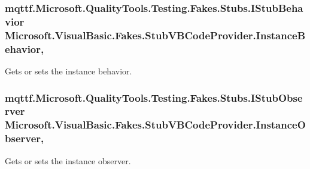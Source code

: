 \hypertarget{class_microsoft_1_1_visual_basic_1_1_fakes_1_1_stub_v_b_code_provider_ace79ea1790dee743c9803210aa43a1ec}{
\subsubsection[{Instance\-Behavior}]{\setlength{\rightskip}{0pt plus 5cm}mqttf.\-Microsoft.\-Quality\-Tools.\-Testing.\-Fakes.\-Stubs.\-I\-Stub\-Behavior Microsoft.\-Visual\-Basic.\-Fakes.\-Stub\-V\-B\-Code\-Provider.\-Instance\-Behavior\hspace{0.3cm}{\ttfamily [get]}, {\ttfamily [set]}}}\label{class_microsoft_1_1_visual_basic_1_1_fakes_1_1_stub_v_b_code_provider_ace79ea1790dee743c9803210aa43a1ec}


Gets or sets the instance behavior.

\hypertarget{class_microsoft_1_1_visual_basic_1_1_fakes_1_1_stub_v_b_code_provider_a46d5cfd9d5b313f3ba1c9324069fadd3}{
\subsubsection[{Instance\-Observer}]{\setlength{\rightskip}{0pt plus 5cm}mqttf.\-Microsoft.\-Quality\-Tools.\-Testing.\-Fakes.\-Stubs.\-I\-Stub\-Observer Microsoft.\-Visual\-Basic.\-Fakes.\-Stub\-V\-B\-Code\-Provider.\-Instance\-Observer\hspace{0.3cm}{\ttfamily [get]}, {\ttfamily [set]}}}\label{class_microsoft_1_1_visual_basic_1_1_fakes_1_1_stub_v_b_code_provider_a46d5cfd9d5b313f3ba1c9324069fadd3}


Gets or sets the instance observer.

